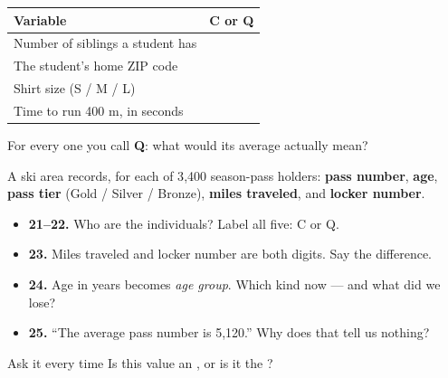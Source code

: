 \documentclass[aspectratio=169, 11pt]{beamer}
\begin{document}

\begin{frame}[t, plain]
  \vspace{4pt}
  \renewcommand{\arraystretch}{1.7}
  \begin{tabularx}{\textwidth}{@{} X C{3.2cm} @{}}
    \hline
    \textbf{Variable} & \textbf{C or Q} \\
    \hline
    Number of siblings a student has & \\
    The student's home ZIP code      & \\
    Shirt size (S / M / L)           & \\
    Time to run 400 m, in seconds    & \\
    \hline
  \end{tabularx}
  \vspace{10pt}
  \begin{center}
    {\small\color{slate} For every one you call \textbf{Q}: what would its average
    actually mean?}
  \end{center}
\end{frame}

\begin{frame}[t, plain]
  A ski area records, for each of 3{,}400 season-pass holders: \textbf{pass number},
  \textbf{age}, \textbf{pass tier} (Gold / Silver / Bronze), \textbf{miles traveled}, and
  \textbf{locker number}.
  \begin{itemize}\setlength{\itemsep}{5pt}
    \item \textbf{21--22.} Who are the individuals? Label all five: C or Q.
    \item \textbf{23.} Miles traveled and locker number are both digits. Say the difference.
    \item \textbf{24.} Age in years becomes \emph{age group}. Which kind now --- and what did
          we lose?
    \item \textbf{25.} ``The average pass number is 5{,}120.'' Why does that tell us nothing?
  \end{itemize}
  \begin{block}{Ask it every time}
    Is this value an , or is it the ?
  \end{block}
\end{frame}
\end{document}
